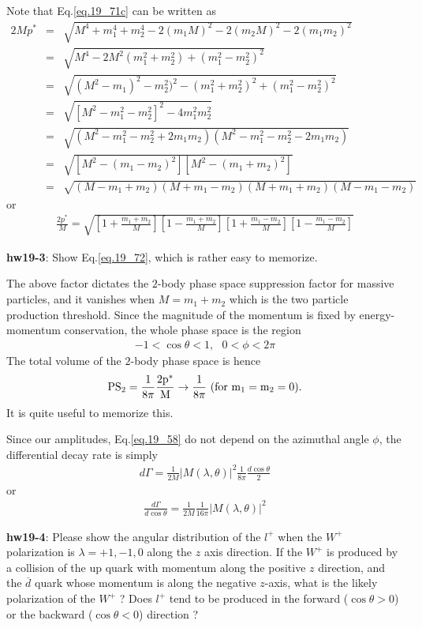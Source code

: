 \documentclass[12pt]{article}
\def\lmd{\lambda}
\def\PS{\rm PS}
\begin{document}
Note that Eq.\ref{eq.19_71c} can be written as
\begin{eqnarray}
  2Mp^*
  &=& \sqrt{M^4+m_1^4+m_2^4-2(m_1 M)^2-2(m_2M)^2-2(m_1m_2)^2}\\
  &=& \sqrt{M^4-2M^2(m_1^2+m_2^2)+(m_1^2-m_2^2)^2}\\
  &=& \sqrt{(M^2-m_1)^2-m_2^2)^2-(m_1^2+m_2^2)^2+(m_1^2-m_2^2)^2} \\
  &=& \sqrt{[M^2-m_1^2-m_2^2]^2-4m_1^2m_2^2} \\
  &=& \sqrt{(M^2-m_1^2-m_2^2+2m_1m_2)(M^2-m_1^2-m_2^2-2m_1m_2)}\\
  &=& \sqrt{[M^2-(m_1-m_2)^2][M^2-(m_1+m_2)^2]} \\
  &=& \sqrt{(M-m_1+m_2)(M+m_1-m_2)(M+m_1+m_2)(M-m_1-m_2)} \label{eq.19_72}
\end{eqnarray}
or
\begin{eqnarray}
  \frac{2p^*}{M}= \sqrt{[1+\frac{m_1+m_2}{M}][1-\frac{m_1+m_2}{M}][1+\frac{m_1-m_2}{M}][1-\frac{m_1-m_2}{M}]}\label{eq.19_73}
\end{eqnarray}

{\bf hw19-3}: Show Eq.\ref{eq.19_72}, which is rather easy to memorize.

The above factor dictates the $2$-body phase space suppression factor
for massive particles, and it vanishes when
 $M = m_1+m_2$
which is the two particle production threshold. Since the magnitude of
the momentum is fixed by energy-momentum conservation, the whole phase
space is the region
\begin{eqnarray}
  -1 < \cos\theta < 1,~~~ 0 < \phi < 2\pi
\end{eqnarray}
The total volume of the $2$-body phase space is hence
\begin{eqnarray}
  \PS_2 = \frac{1}{8\pi} \frac{2p^*}{M} \to \frac{1}{8\pi}~(for~m_1=m_2=0). \label{eq.19_76}
\end{eqnarray}
It is quite useful to memorize this.

Since our amplitudes, Eq.\ref{eq.19_58} do not depend on the azimuthal
angle $\phi$, the differential decay rate is simply
\begin{eqnarray}
  d\Gamma = \frac{1}{2M} |M(\lmd,\theta)|^2 \frac{1}{8\pi} \frac{d\cos\theta}{2} \label{eq.19_77}
\end{eqnarray}
or
\begin{eqnarray}
  \frac{d\Gamma}{d\cos\theta}=\frac{1}{2M}\frac{1}{16\pi} |M(\lambda,\theta)|^2\label{eq.19_78}
\end{eqnarray}

{\bf hw19-4}:  Please show the angular distribution of the $l^+$ when the $W^+$
polarization is $\lmd = +1, -1, 0$ along the $z$ axis direction. If the
$W^+$ is produced by a collision of the up quark with momentum along
the positive $z$ direction, and the ${\overline d}$ quark whose momentum is along
the negative $z$-axis, what is the likely polarization of the $W^+$ ?
Does $l^+$ tend to be produced in the forward ($\cos\theta > 0$) or the
backward ($\cos\theta < 0$) direction ?
\end{document}
